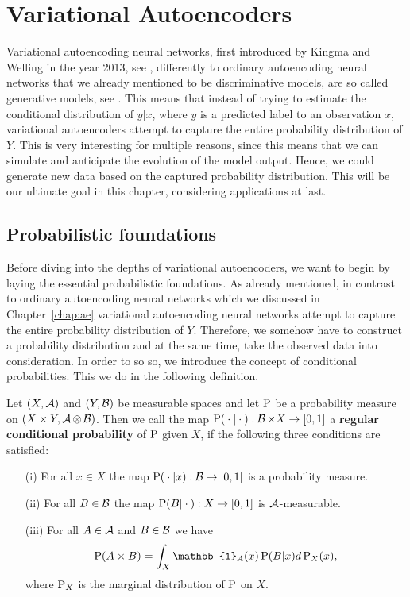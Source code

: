 \chapter{Variational Autoencoders}\label{chap:vae}
Variational autoencoding neural networks, first introduced by Kingma and Welling in the year 2013, see \cite{kingma2013auto}, differently to ordinary autoencoding neural networks that we already mentioned to be discriminative models, are so called generative models, see \cite[Chapter~5]{cinelli2021variational}. This means that instead of trying to estimate the conditional distribution of $y|x$, where $y$ is a predicted label to an observation $x$, variational autoencoders attempt to capture the entire probability distribution of $Y$. This is very interesting for multiple reasons, since this means that we can simulate and anticipate the evolution of the model output. Hence, we could generate new data based on the captured probability distribution. This will be our ultimate goal in this chapter, considering applications at last.

\section{Probabilistic foundations}\label{sec:prob_foundations}

Before diving into the depths of variational autoencoders, we want to begin by laying the essential probabilistic foundations. As already mentioned, in contrast to ordinary autoencoding neural networks which we discussed in Chapter~\ref{chap:ae} variational autoencoding neural networks attempt to capture the entire probability distribution of $Y$. Therefore, we somehow have to construct a probability distribution and at the same time, take the observed data into consideration. In order to so so, we introduce the concept of conditional probabilities. This we do in the following definition.

\begin{definition}\label{def:cond_prob}
Let $(X,\operatorname{\mathcal{A}})$ and $(Y,\operatorname{\mathcal{B}})$ be measurable spaces and let $\operatorname{\text{P}}$ be a probability measure on $(X\times Y, \operatorname{\mathcal{A}}\otimes \operatorname{\mathcal{B}})$. Then we call the map $\operatorname{\text{P}}({}\cdot{}|{}\cdot{}):\operatorname{\mathcal{B}}\times X \to [0, 1]$ a \textbf{regular conditional probability} of $\operatorname{\text{P}}$ given $X$, if the following three conditions are satisfied:
\begin{itemize}
\item[(i)]   For all $x\in X$ the map $\operatorname{\text{P}}({}\cdot{}|x): \operatorname{\mathcal{B}} \to [0,1]$ is a probability measure.
\item[(ii)]  For all $B\in\operatorname{\mathcal{B}}$ the map $\operatorname{\text{P}}(B|{}\cdot{}): X \to [0,1]$ is $\operatorname{\mathcal{A}}$-measurable.
\item[(iii)] For all $A\in\operatorname{\mathcal{A}}$ and $B\in\operatorname{\mathcal{B}}$ we have \begin{align*}
\prob(A\times B) = \int_{X} \mathbb{1}_{A}(x) \prob(B|x)d\prob_X(x),
\end{align*}
where $\operatorname{\text{P}}_X$ is the marginal distribution of $\operatorname{\text{P}}$ on $X$.
\end{itemize}
\end{definition}

